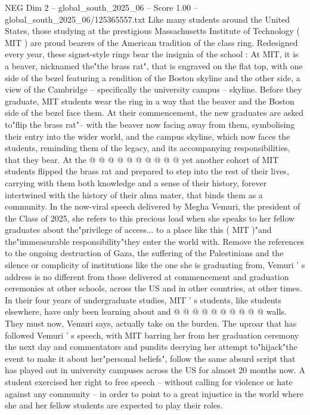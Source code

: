 \begin{textsample}{NEG Dim 2 – global\_south\_2025\_06 – Score 1.00 – global\_south\_2025\_06/125365557.txt}  \label{ex:f2_neg_201}
Like many students around the United States, those studying at the prestigious Massachusetts Institute of Technology ( MIT ) are proud bearers of the American tradition of the class ring.
Redesigned every year, these signet-style rings bear the insignia of the school : At MIT, it is a beaver, nicknamed the"the brass rat", that is engraved on the flat top, with one side of the bezel featuring a rendition of the Boston skyline and the other side, a view of the Cambridge -- specifically the university campus -- skyline.
Before they graduate, MIT students wear the ring in a way that the beaver and the Boston side of the bezel face them.
At their commencement, the new graduates are asked to"flip the brass rat"-- with the beaver now facing away from them, symbolising their entry into the wider world, and the campus skyline, which now faces the students, reminding them of the legacy, and its accompanying responsibilities, that they bear.
At the @ @ @ @ @ @ @ @ @ @ yet another cohort of MIT students flipped the brass rat and prepared to step into the rest of their lives, carrying with them both knowledge and a sense of their history, forever intertwined with the history of their alma mater, that binds them as a community.
In the now-viral speech delivered by Megha Vemuri, the president of the Class of 2025, she refers to this precious load when she speaks to her fellow graduates about the"privilege of access... to a place like this ( MIT )"and the"immeasurable responsibility"they enter the world with.
Remove the references to the ongoing destruction of Gaza, the suffering of the Palestinians and the silence or complicity of institutions like the one she is graduating from, Vemuri ' s address is no different from those delivered at commencement and graduation ceremonies at other schools, across the US and in other countries, at other times.
In their four years of undergraduate studies, MIT ' s students, like students elsewhere, have only been learning about and @ @ @ @ @ @ @ @ @ @ walls.
They must now, Vemuri says, actually take on the burden.
The uproar that has followed Vemuri ' s speech, with MIT barring her from her graduation ceremony the next day and commentators and pundits decrying her attempt to"hijack"the event to make it about her"personal beliefs", follow the same absurd script that has played out in university campuses across the US for almost 20 months now.
A student exercised her right to free speech -- without calling for violence or hate against any community -- in order to point to a great injustice in the world where she and her fellow students are expected to play their roles.

\end{textsample}
